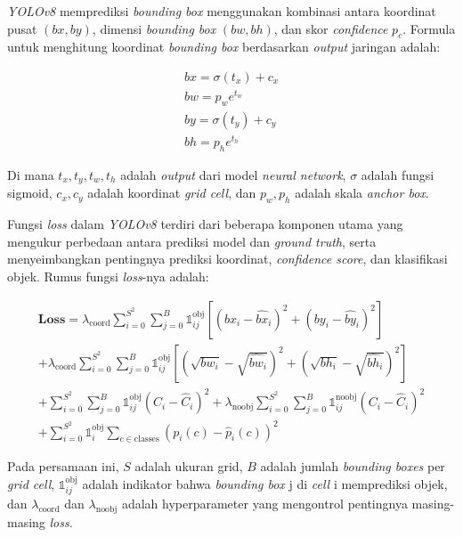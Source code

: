 \emph{YOLOv8} memprediksi \emph{bounding box} menggunakan kombinasi antara koordinat pusat \((bx, by)\), dimensi \emph{bounding box} \((bw, bh)\), dan skor \emph{confidence} \(p_c\). Formula untuk menghitung koordinat \emph{bounding box} berdasarkan \emph{output} jaringan adalah:

\begin{equation}
  \begin{array}{c}
  bx = \sigma(t_x) + c_x\\
  bw = p_w e^{t_w}\\
  by = \sigma(t_y) + c_y\\ 
  bh = p_h e^{t_h}
  \end{array}
\end{equation}

Di mana \(t_x, t_y, t_w, t_h\) adalah \emph{output} dari model \emph{neural network}, \(\sigma\) adalah fungsi sigmoid, \(c_x, c_y\) adalah koordinat \emph{grid cell}, dan \(p_w, p_h\) adalah skala \emph{anchor box}.

Fungsi \emph{loss} dalam \emph{YOLOv8} terdiri dari beberapa komponen utama yang mengukur perbedaan antara prediksi model dan \emph{ground truth}, serta menyeimbangkan pentingnya prediksi koordinat, \emph{confidence score}, dan klasifikasi objek. Rumus fungsi \emph{loss}-nya adalah:

\begin{equation}
  \begin{array}{c}
  \mathbf{Loss} = \lambda_{\mathrm{coord}} \sum_{i=0}^{S^2} \sum_{j=0}^{B} \mathbb{1}_{ij}^{\mathrm{obj}} \left[ (bx_i - \hat{bx}_i)^2 + (by_i - \hat{by}_i)^2 \right] \\[10pt]
  + \lambda_{\mathrm{coord}} \sum_{i=0}^{S^2} \sum_{j=0}^{B} \mathbb{1}_{ij}^{\mathrm{obj}} \left[ (\sqrt{bw_i} - \sqrt{\hat{bw}_i})^2 + (\sqrt{bh_i} - \sqrt{\hat{bh}_i})^2 \right] \\[10pt]
  + \sum_{i=0}^{S^2} \sum_{j=0}^{B} \mathbb{1}_{ij}^{\mathrm{obj}} (C_i - \hat{C}_i)^2 + \lambda_{\mathrm{noobj}} \sum_{i=0}^{S^2} \sum_{j=0}^{B} \mathbb{1}_{ij}^{\mathrm{noobj}} (C_i - \hat{C}_i)^2 \\[10pt]
  + \sum_{i=0}^{S^2} \mathbb{1}_{i}^{\mathrm{obj}} \sum_{c \in \mathrm{classes}} (p_i(c) - \hat{p}_i(c))^2
  \end{array}
\end{equation}

Pada persamaan ini, \(S\) adalah ukuran grid, \(B\) adalah jumlah \emph{bounding boxes} per \emph{grid cell}, \(\mathbb{1}_{ij}^{\mathrm{obj}}\) adalah indikator bahwa \emph{bounding box} j di \emph{cell} i memprediksi objek, dan \(\lambda_{\mathrm{coord}}\) dan \(\lambda_{\mathrm{noobj}}\) adalah hyperparameter yang mengontrol pentingnya masing-masing \emph{loss}.
\newpage

